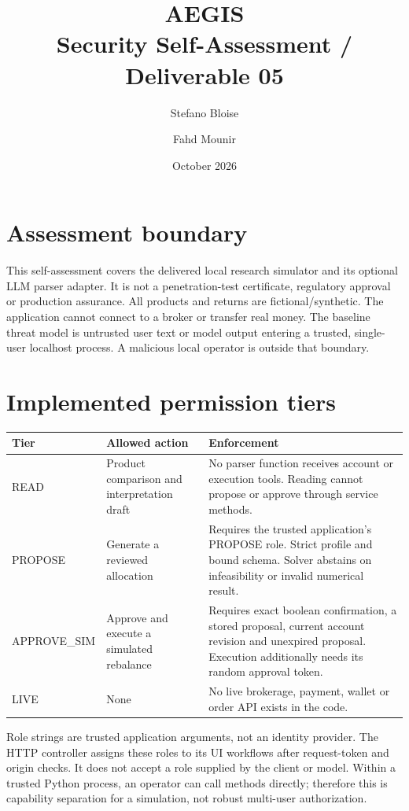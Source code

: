 \documentclass[11pt,a4paper]{article}
\title{AEGIS\\\large Security Self-Assessment / Deliverable 05}
\author{Stefano Bloise \and Fahd Mounir}\date{October 2026}
\begin{document}
\maketitle
\section{Assessment boundary}
This self-assessment covers the delivered local research simulator and its optional LLM parser adapter. It is not a penetration-test certificate, regulatory approval or production assurance. All products and returns are fictional/synthetic. The application cannot connect to a broker or transfer real money. The baseline threat model is untrusted user text or model output entering a trusted, single-user localhost process. A malicious local operator is outside that boundary.

\section{Implemented permission tiers}
\begin{longtable}{p{.18\linewidth}p{.32\linewidth}p{.42\linewidth}}
\toprule Tier & Allowed action & Enforcement\\\midrule
READ & Product comparison and interpretation draft & No parser function receives account or execution tools. Reading cannot propose or approve through service methods.\\
PROPOSE & Generate a reviewed allocation & Requires the trusted application's PROPOSE role. Strict profile and bound schema. Solver abstains on infeasibility or invalid numerical result.\\
APPROVE\_SIM & Approve and execute a simulated rebalance & Requires exact boolean confirmation, a stored proposal, current account revision and unexpired proposal. Execution additionally needs its random approval token.\\
LIVE & None & No live brokerage, payment, wallet or order API exists in the code.\\\bottomrule
\end{longtable}
Role strings are trusted application arguments, not an identity provider. The HTTP controller assigns these roles to its UI workflows after request-token and origin checks. It does not accept a role supplied by the client or model. Within a trusted Python process, an operator can call methods directly; therefore this is capability separation for a simulation, not robust multi-user authorization.
\end{document}
